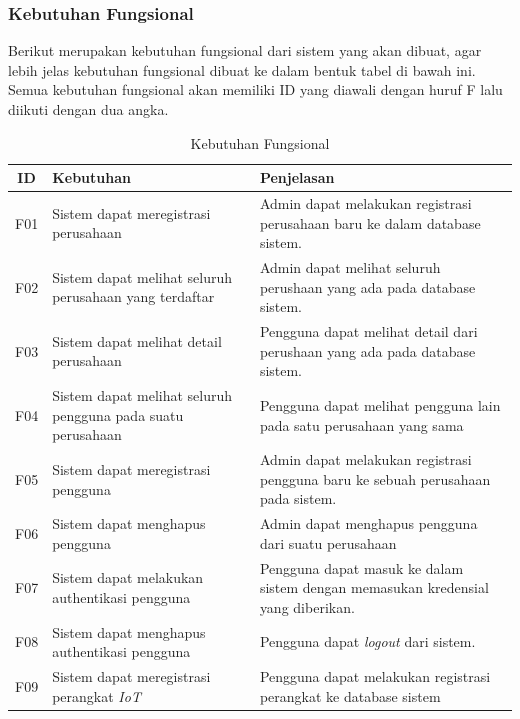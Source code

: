 \subsubsection{Kebutuhan Fungsional}
Berikut merupakan kebutuhan fungsional dari sistem yang akan dibuat, agar lebih jelas kebutuhan fungsional dibuat ke dalam bentuk tabel di bawah ini. Semua kebutuhan fungsional akan memiliki ID yang diawali dengan huruf F lalu diikuti dengan dua angka.


\begin{table}[h]
  \caption{Kebutuhan Fungsional}
  \label{tab:kebutuhan-fungsional}
  \centering
  \begin{tabular}{|c|p{4.5cm}|p{8cm}|}
    \hline
    ID  & Kebutuhan                                                   & Penjelasan                                                                       \\
    \hline
    F01 & Sistem dapat meregistrasi perusahaan                        & Admin dapat melakukan registrasi perusahaan baru ke dalam database sistem.       \\
    \hline
    F02 & Sistem dapat melihat seluruh perusahaan yang terdaftar      & Admin dapat melihat seluruh perushaan yang ada pada database sistem.             \\
    \hline
    F03 & Sistem dapat melihat detail perusahaan                      & Pengguna dapat melihat detail dari perushaan yang ada pada database sistem.      \\
    \hline
    F04 & Sistem dapat melihat seluruh pengguna pada suatu perusahaan & Pengguna dapat melihat pengguna lain pada satu perusahaan yang sama              \\
    \hline
    F05 & Sistem dapat meregistrasi pengguna                          & Admin dapat melakukan registrasi pengguna baru ke sebuah perusahaan pada sistem. \\
    \hline
    F06 & Sistem dapat menghapus pengguna                             & Admin dapat menghapus pengguna dari suatu perusahaan                             \\
    \hline
    F07 & Sistem dapat melakukan authentikasi pengguna                & Pengguna dapat masuk ke dalam sistem dengan memasukan kredensial yang diberikan. \\
    \hline
    F08 & Sistem dapat menghapus authentikasi pengguna                & Pengguna dapat \textit{logout} dari sistem.                                      \\
    \hline
    F09 & Sistem dapat meregistrasi perangkat \textit{IoT}            & Pengguna dapat melakukan registrasi perangkat ke database sistem                 \\
    \hline
  \end{tabular}
\end{table}


